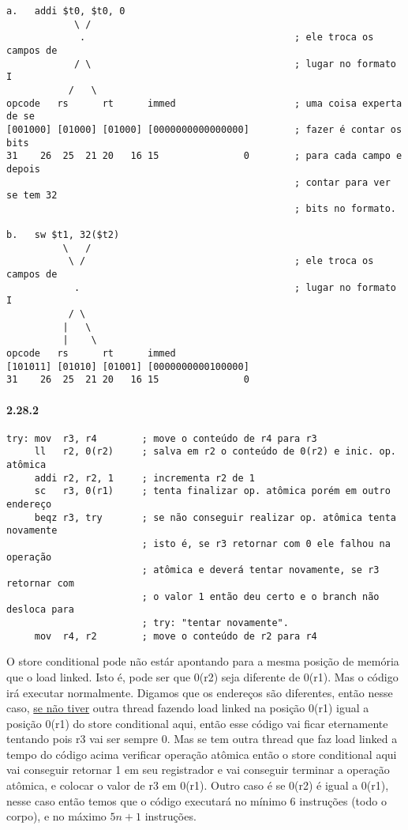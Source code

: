 \documentclass{article}
\begin{document}
\pagebreak
\begin{verbatim}
a.   addi $t0, $t0, 0
            \ /
             .                                     ; ele troca os campos de
            / \                                    ; lugar no formato I
           /   \
opcode   rs      rt      immed                     ; uma coisa experta de se
[001000] [01000] [01000] [0000000000000000]        ; fazer é contar os bits
31    26  25  21 20   16 15               0        ; para cada campo e depois
                                                   ; contar para ver se tem 32
                                                   ; bits no formato.

b.   sw $t1, 32($t2)
          \   /
           \ /                                     ; ele troca os campos de
            .                                      ; lugar no formato I
           / \
          |   \
          |    \
opcode   rs      rt      immed
[101011] [01010] [01001] [0000000000100000]
31    26  25  21 20   16 15               0

\end{verbatim}

\paragraph{2.28.2}

\begin{verbatim}
try: mov  r3, r4        ; move o conteúdo de r4 para r3
     ll   r2, 0(r2)     ; salva em r2 o conteúdo de 0(r2) e inic. op. atômica
     addi r2, r2, 1     ; incrementa r2 de 1
     sc   r3, 0(r1)     ; tenta finalizar op. atômica porém em outro endereço
     beqz r3, try       ; se não conseguir realizar op. atômica tenta novamente
                        ; isto é, se r3 retornar com 0 ele falhou na operação
                        ; atômica e deverá tentar novamente, se r3 retornar com 
                        ; o valor 1 então deu certo e o branch não desloca para
                        ; try: "tentar novamente".
     mov  r4, r2        ; move o conteúdo de r2 para r4
\end{verbatim}

O store conditional pode não estár apontando para a mesma posição de memória 
que o load linked. Isto é, pode ser que 0(r2) seja diferente de 0(r1). Mas o 
código irá executar normalmente. Digamos que os endereços são diferentes, então 
nesse caso, \underline{se não tiver} outra thread fazendo load linked na 
posição 0(r1) igual a posição 0(r1) do store conditional aqui, então esse código
vai ficar eternamente tentando pois r3 vai ser sempre 0. Mas se tem outra 
thread que faz load linked a tempo do código acima verificar operação atômica 
então o store conditional aqui vai conseguir retornar 1 em seu registrador e 
vai conseguir terminar a operação atômica, e colocar o valor de r3 em 0(r1). 
Outro caso é se 0(r2) é igual a 0(r1), nesse caso então temos que o código 
executará no mínimo 6 instruções (todo o corpo), e no máximo $5n + 1$ 
instruções.
\end{document}
